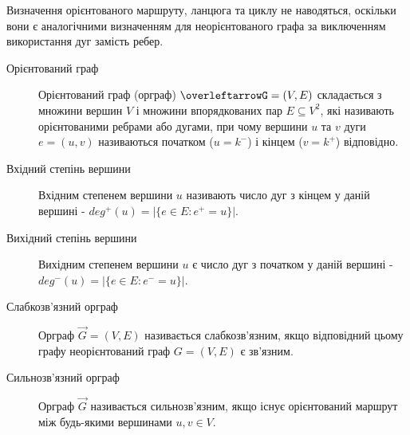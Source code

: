 
Визначення орієнтованого маршруту, ланцюга та циклу не наводяться, оскільки вони є аналогічними визначенням для неорієнтованого графа за виключенням використання дуг замість ребер.

\begin{description}
  \item[Орієнтований граф] Орієнтований граф (орграф) $\overleftarrowG=(V,E)$ складається з множини вершин $V$ і множини впорядкованих пар $E \subseteq V^2$, які називають орієнтованими ребрами або дугами, при чому вершини $u$ та $v$ дуги $e=(u,v)$ називаються початком ($u=k^-$) і кінцем ($v=k^+$) відповідно.
  \item[Вхідний степінь вершини] Вхідним степенем вершини $u$ називають число дуг з кінцем у даній вершині - $deg^+(u)=\vert\lbrace e \in E : e^+=u\rbrace \vert$.
  \item[Вихідний степінь вершини] Вихідним степенем вершини $u$ є число дуг з початком у даній вершині - $deg^-(u)=\vert \lbrace e \in E : e^-=u \rbrace \vert$.
  \item[Слабкозв'язний орграф] Орграф $\overrightarrow G=(V,E)$ називається слабкозв'язним, якщо відповідний цьому графу неорієнтований граф $G=(V,E)$ є зв'язним.
  \item[Сильнозв'язний орграф] Орграф $\overrightarrow G$ називається сильнозв'язним, якщо існує орієнтований маршрут між будь-якими вершинами $u,v \in V$.
\end{description}
